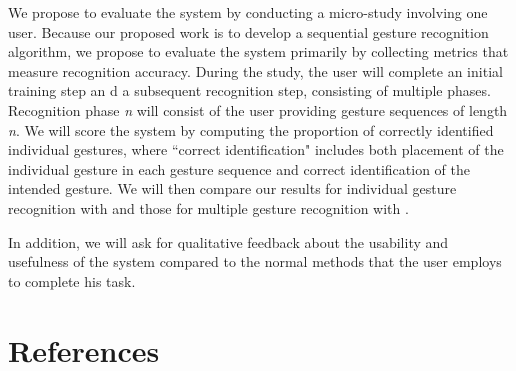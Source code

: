 \documentclass[twoside]{article}
\begin{document}
\begin{multicols}{2}
We propose to evaluate the system by conducting a micro-study involving one
user. Because our proposed work is to develop a sequential gesture recognition
algorithm, we propose to evaluate the system primarily by collecting metrics
that measure recognition accuracy. During the study, the user will complete an
initial training step an d a subsequent recognition step, consisting of multiple
phases.
Recognition phase \emph{n} will consist of the user providing gesture sequences
of length \emph{n}. We will score the system by computing the proportion of correctly identified individual gestures, where ``correct identification" includes both placement of the individual gesture in each gesture sequence and correct identification of the intended gesture. We will then compare our results for individual gesture recognition with \cite{tanguay_jr_hidden_1995} and those for multiple gesture recognition with \cite{yang_gesture_1994}.

In addition, we will ask for qualitative feedback about the usability and
usefulness of the system compared to the normal methods that the user employs to complete his task.

\section{References}

\begin{spacing}{0.9}
%
\begingroup
\renewcommand{\section}[2]{}%

\endgroup
\end{spacing}

\end{multicols}
\end{document}
